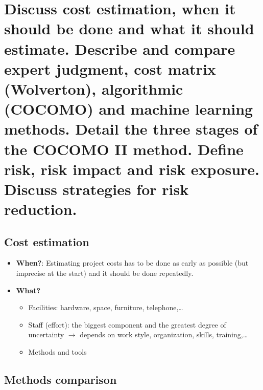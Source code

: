 \clearpage{}
\section{Discuss cost estimation, when it should be done and what it should
estimate. Describe and compare expert judgment, cost matrix (Wolverton),
algorithmic (COCOMO) and machine learning methods. Detail the three stages
of the COCOMO II method. Define risk, risk impact and risk exposure. Discuss
strategies for risk reduction.}

\subsection{Cost estimation}

\begin{itemize}
    \item \textbf{When?}: 
        Estimating project costs has to be done as early as possible (but imprecise at the start) and
        it should be done repeatedly.

    \item \textbf{What?}
        \begin{itemize}
            \item Facilities: hardware, space, furniture, telephone,\ldots
            \item Staff (effort): the biggest component and the greatest degree of uncertainty $\rightarrow$ depends on work style, organization, skills, training,\ldots
            \item Methods and tools
        \end{itemize}
\end{itemize}


\subsection{Methods comparison}

